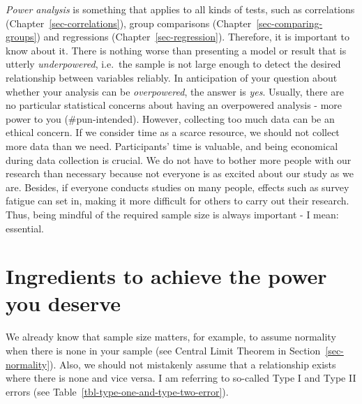 \documentclass[
  letterpaper,
  DIV=11,
  numbers=noendperiod]{scrreprt}
\begin{document}
\emph{Power analysis} is something that applies to all kinds of tests,
such as correlations (Chapter~\ref{sec-correlations}), group comparisons
(Chapter~\ref{sec-comparing-groups}) and regressions
(Chapter~\ref{sec-regression}). Therefore, it is important to know about
it. There is nothing worse than presenting a model or result that is
utterly \emph{underpowered}, i.e.~the sample is not large enough to
detect the desired relationship between variables reliably. In
anticipation of your question about whether your analysis can be
\emph{overpowered}, the answer is \emph{yes}. Usually, there are no
particular statistical concerns about having an overpowered analysis -
more power to you (\#pun-intended). However, collecting too much data
can be an ethical concern. If we consider time as a scarce resource, we
should not collect more data than we need. Participants' time is
valuable, and being economical during data collection is crucial. We do
not have to bother more people with our research than necessary because
not everyone is as excited about our study as we are. Besides, if
everyone conducts studies on many people, effects such as survey fatigue
can set in, making it more difficult for others to carry out their
research. Thus, being mindful of the required sample size is always
important - I mean: essential.

\section{Ingredients to achieve the power you
deserve}\label{sec-sec-ingredients-power-analysis}

We already know that sample size matters, for example, to assume
normality when there is none in your sample (see Central Limit Theorem
in Section~\ref{sec-normality}). Also, we should not mistakenly assume
that a relationship exists where there is none and vice versa. I am
referring to so-called Type I and Type II errors (see
Table~\ref{tbl-type-one-and-type-two-error}).
\end{document}

